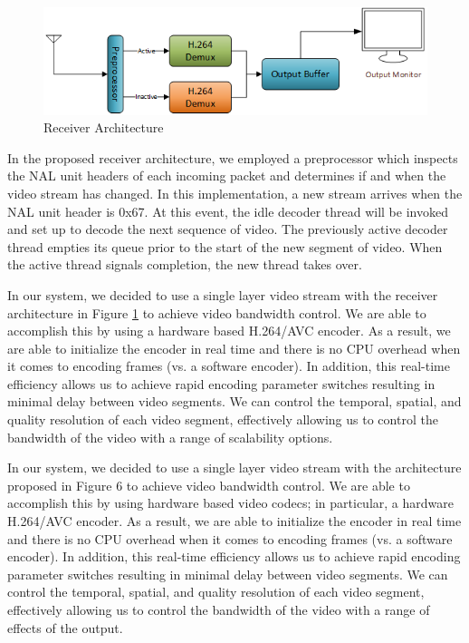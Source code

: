 \documentclass[preprint, 12pt]{elsarticle}
\begin{document}
\begin{figure}[h]
\centering
\includegraphics[width=0.8\linewidth]{ReceiverArchitecture.png}
\caption{Receiver Architecture}
\label{fig:ReceiverArchitecture}
\end{figure}
In the proposed receiver architecture, we employed a preprocessor which inspects the NAL unit headers of each incoming packet and determines if and when the video stream has changed. In this implementation, a new stream arrives when the NAL unit header is 0x67. At this event, the idle decoder thread will be invoked and set up to decode the next sequence of video. The previously active decoder thread empties its queue prior to the start of the new segment of video. When the active thread signals completion, the new thread takes over.

In our system, we decided to use a single layer video stream with the receiver architecture in Figure \ref{fig:ReceiverArchitecture} to achieve video bandwidth control. We are able to accomplish this by using a hardware based H.264/AVC encoder. As a result, we are able to initialize the encoder in real time and there is no CPU overhead when it comes to encoding frames (vs. a software encoder). In addition, this real-time efficiency allows us to achieve rapid encoding parameter switches resulting in minimal delay between video segments. We can control the temporal, spatial, and quality resolution of each video segment, effectively allowing us to control the bandwidth of the video with a range of scalability options. 

In our system, we decided to use a single layer video stream with the architecture proposed in Figure 6 to achieve video bandwidth control. We are able to accomplish this by using hardware based video codecs; in particular, a hardware H.264/AVC encoder. As a result, we are able to initialize the encoder in real time and there is no CPU overhead when it comes to encoding frames (vs. a software encoder). In addition, this real-time efficiency allows us to achieve rapid encoding parameter switches resulting in minimal delay between video segments. We can control the temporal, spatial, and quality resolution of each video segment, effectively allowing us to control the bandwidth of the video with a range of effects of the output.
\end{document}
